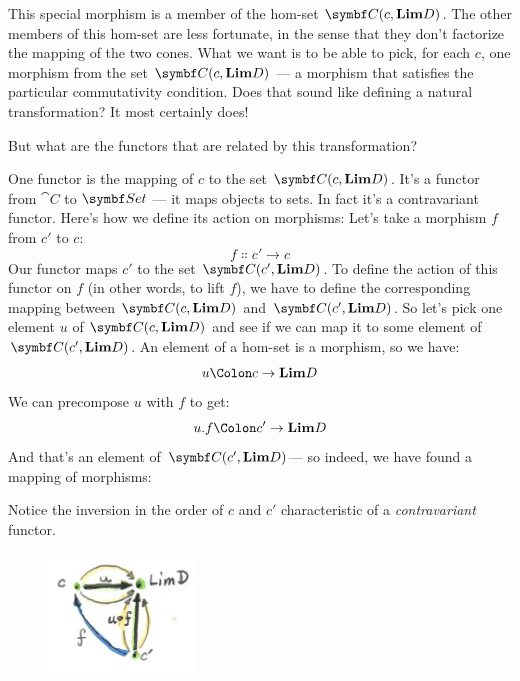 This special morphism is a member of the hom-set $\cat{C}(c, \Lim[D])$.
The other members of this hom-set are less fortunate, in the sense that
they don't factorize the mapping of the two cones. What we want is to be able to
pick, for each $c$, one morphism from the set
$\cat{C}(c, \Lim[D])$ --- a morphism that satisfies the particular
commutativity condition. Does that sound like defining a natural
transformation? It most certainly does!

But what are the functors that are related by this transformation?

One functor is the mapping of $c$ to the set
$\cat{C}(c, \Lim[D])$. It's a functor from $\cat{C}$ to $\Set$ ---
it maps objects to sets. In fact it's a contravariant functor. Here's
how we define its action on morphisms: Let's take a morphism $f$
from $c'$ to $c$:
\[f \Colon c' \to c\]
Our functor maps $c'$ to the set
$\cat{C}(c', \Lim[D])$. To define the action of this functor on
$f$ (in other words, to lift $f$), we have to define the
corresponding mapping between $\cat{C}(c, \Lim[D])$ and
$\cat{C}(c', \Lim[D])$. So let's pick one element $u$ of
$\cat{C}(c, \Lim[D])$ and see if we can map it to some element of
$\cat{C}(c', \Lim[D])$. An element of a hom-set is a morphism, so
we have:
\[u \Colon c \to \Lim[D]\]
We can precompose $u$ with $f$ to get:
\[u . f \Colon c' \to \Lim[D]\]
And that's an element of $\cat{C}(c', \Lim[D])$--- so indeed, we
have found a mapping of morphisms:

Notice the inversion in the order of $c$ and $c'$
characteristic of a \emph{contravariant} functor.

\begin{figure}[H]
  \centering
  \includegraphics[width=0.35\textwidth]{images/homsetmapping.jpg}
\end{figure}

